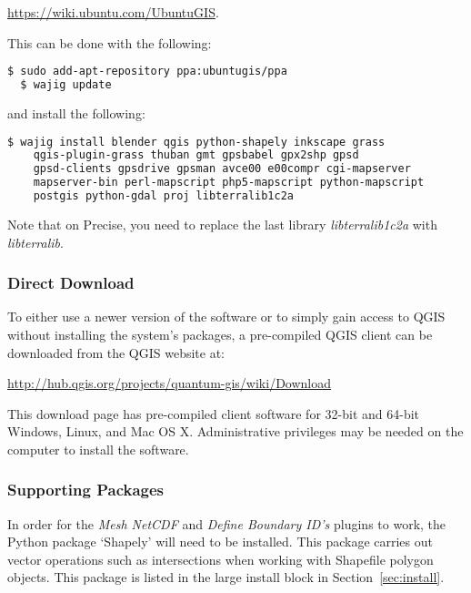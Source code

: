 \url{https://wiki.ubuntu.com/UbuntuGIS}.

This can be done with the following:

\begin{example}
  \begin{lstlisting}[language=bash]
  $ sudo add-apt-repository ppa:ubuntugis/ppa 
  $ wajig update
\end{lstlisting}
\end{example}

and install the following:

\begin{example}
  \begin{lstlisting}[language=bash]
  $ wajig install blender qgis python-shapely inkscape grass
    qgis-plugin-grass thuban gmt gpsbabel gpx2shp gpsd 
    gpsd-clients gpsdrive gpsman avce00 e00compr cgi-mapserver
    mapserver-bin perl-mapscript php5-mapscript python-mapscript
    postgis python-gdal proj libterralib1c2a
\end{lstlisting}
\end{example}

Note that on Precise, you need to replace the last library \emph{libterralib1c2a} with \emph{libterralib}.

\subsubsection{Direct Download}

To either use a newer version of the software or to simply gain access to
QGIS without installing the system's packages, a pre-compiled QGIS
client can be downloaded from the QGIS website at:

\url{http://hub.qgis.org/projects/quantum-gis/wiki/Download}

This download page has pre-compiled client software for 32-bit and 64-bit
Windows, Linux, and Mac OS X. Administrative privileges may be needed on the
computer to install the software.

\subsubsection{Supporting Packages}
In order for the \emph{Mesh NetCDF} and \emph{Define Boundary ID's} plugins to work, the Python package `Shapely' will need to be installed. This package carries out vector operations such as intersections when working with Shapefile polygon objects. This package is listed in the large install block in Section~\ref{sec:install}.

